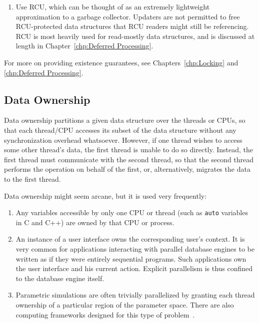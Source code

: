 {\begin{enumerate}
		developers should exercise some
		caution~\cite{Blundell2005DebunkTM,Blundell2006TMdeadlock,McKenney2007PLOSTM},
		particularly in performance-critical code.
		In particular, existence guarantees require that the
		transaction cover the full path from a global reference
		to the data elements being updated.
	\item	Use RCU, which can be thought of as an extremely lightweight
		approximation to a garbage collector.
		Updaters are not permitted to free RCU-protected
		data structures that RCU readers might still be referencing.
		RCU is most heavily used for read-mostly data structures,
		and is discussed at length in
		Chapter~\ref{chp:Deferred Processing}.
	\end{enumerate}

	For more on providing existence guarantees, see
	Chapters~\ref{chp:Locking} and \ref{chp:Deferred Processing}.
} \QuickQuizEnd

\subsection{Data Ownership}
\label{sec:SMPdesign:Data Ownership}

Data ownership partitions a given data structure over the threads
or CPUs, so that each thread/CPU accesses its subset of the data
structure without any synchronization overhead whatsoever.
However, if one thread wishes to access some other thread's data,
the first thread is unable to do so directly.
Instead, the first thread must communicate with the second thread,
so that the second thread performs the operation on behalf of the
first, or, alternatively, migrates the data to the first thread.

Data ownership might seem arcane, but it is used very frequently:
\begin{enumerate}
\item	Any variables accessible by only one CPU or thread
	(such as {\tt auto} variables in C
	and C++) are owned by that CPU or process.
\item	An instance of a user interface owns the corresponding
	user's context.  It is very common for applications
	interacting with parallel database engines to be
	written as if they were entirely sequential programs.
	Such applications own the user interface and his current
	action.  Explicit parallelism is thus confined to the
	database engine itself.
\item	Parametric simulations are often trivially parallelized
	by granting each thread ownership of a particular region
	of the parameter space.
	There are also computing frameworks designed for this
	type of problem~\cite{BOINC2008}.
\end{enumerate}

